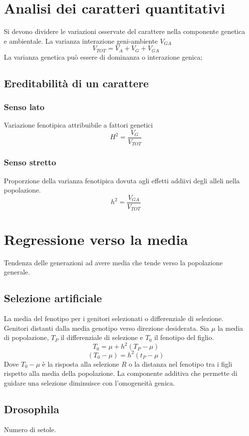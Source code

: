\section{Analisi dei caratteri quantitativi}
Si devono dividere le variazioni osservate del carattere nella componente genetica e ambientale.
La varianza interazione geni-ambiente $V_{GA}$
\[V_{TOT}  = V_A + V_G + V_{GA}\]
La varianza genetica pu\`o essere di dominanza o interazione genica;

	\subsection{Ereditabilit\`a di un carattere}
		
		\subsubsection{Senso lato}
		Variazione fenotipica attribuibile a fattori genetici
		\[H^2 = \dfrac{V_G}{V_{TOT}}\]

		\subsubsection{Senso stretto}
		Proporzione della varianza fenotipica dovuta agli effetti addiivi degli alleli nella popolazione.
		\[h^2 = \dfrac{V_{GA}}{V_{TOT}}\]

\section{Regressione verso la media}
Tendenza delle generazioni ad avere media che tende verso la popolazione generale.

	\subsection{Selezione artificiale}
	La media del fenotipo per i genitori selezionati o differenziale di selezione.
	Genitori distanti dalla media genotipo verso direzione desiderata.
	Sia $\mu$ la media di popolazione, $T_P$ il differenziale di selezione e $T_0$ il fenotipo del figlio.
	\[T_0 = \mu + h^2(T_P - \mu)\]
	\[(T_0 - \mu) = h^2(t_P - \mu)\]
	Dove $T_0-\mu$ \`e la risposta alla selezione $R$ o la distanza nel fenotipo tra i figli rispetto alla media della popolazione.
	La componente additiva che permette di guidare una selezione diminuisce con l'omogeneit\`a genica.

	\subsection{Drosophila}
	Numero di setole.

